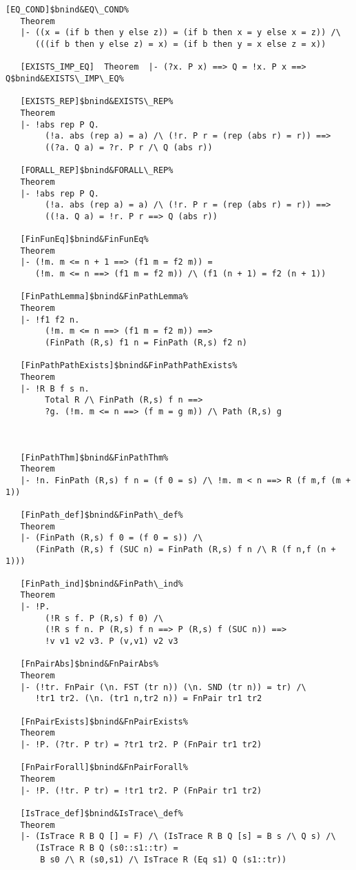 \documentclass[12pt]{article}
\begin{document}
\begin{footnotesize}
\begin{Verbatim}[commandchars=\$\&\%]
   [EQ_COND]$bnind&EQ\_COND%
   Theorem
   |- ((x = (if b then y else z)) = (if b then x = y else x = z)) /\
      (((if b then y else z) = x) = (if b then y = x else z = x))
   
   [EXISTS_IMP_EQ]  Theorem  |- (?x. P x) ==> Q = !x. P x ==> Q$bnind&EXISTS\_IMP\_EQ%
   
   [EXISTS_REP]$bnind&EXISTS\_REP%
   Theorem
   |- !abs rep P Q.
        (!a. abs (rep a) = a) /\ (!r. P r = (rep (abs r) = r)) ==>
        ((?a. Q a) = ?r. P r /\ Q (abs r))
   
   [FORALL_REP]$bnind&FORALL\_REP%
   Theorem
   |- !abs rep P Q.
        (!a. abs (rep a) = a) /\ (!r. P r = (rep (abs r) = r)) ==>
        ((!a. Q a) = !r. P r ==> Q (abs r))
   
   [FinFunEq]$bnind&FinFunEq%
   Theorem
   |- (!m. m <= n + 1 ==> (f1 m = f2 m)) =
      (!m. m <= n ==> (f1 m = f2 m)) /\ (f1 (n + 1) = f2 (n + 1))
   
   [FinPathLemma]$bnind&FinPathLemma%
   Theorem
   |- !f1 f2 n.
        (!m. m <= n ==> (f1 m = f2 m)) ==>
        (FinPath (R,s) f1 n = FinPath (R,s) f2 n)
   
   [FinPathPathExists]$bnind&FinPathPathExists%
   Theorem
   |- !R B f s n.
        Total R /\ FinPath (R,s) f n ==>
        ?g. (!m. m <= n ==> (f m = g m)) /\ Path (R,s) g
   


   [FinPathThm]$bnind&FinPathThm%
   Theorem
   |- !n. FinPath (R,s) f n = (f 0 = s) /\ !m. m < n ==> R (f m,f (m + 1))
   
   [FinPath_def]$bnind&FinPath\_def%
   Theorem
   |- (FinPath (R,s) f 0 = (f 0 = s)) /\
      (FinPath (R,s) f (SUC n) = FinPath (R,s) f n /\ R (f n,f (n + 1)))
   
   [FinPath_ind]$bnind&FinPath\_ind%
   Theorem
   |- !P.
        (!R s f. P (R,s) f 0) /\
        (!R s f n. P (R,s) f n ==> P (R,s) f (SUC n)) ==>
        !v v1 v2 v3. P (v,v1) v2 v3
   
   [FnPairAbs]$bnind&FnPairAbs%
   Theorem
   |- (!tr. FnPair (\n. FST (tr n)) (\n. SND (tr n)) = tr) /\
      !tr1 tr2. (\n. (tr1 n,tr2 n)) = FnPair tr1 tr2
   
   [FnPairExists]$bnind&FnPairExists%
   Theorem
   |- !P. (?tr. P tr) = ?tr1 tr2. P (FnPair tr1 tr2)
   
   [FnPairForall]$bnind&FnPairForall%
   Theorem
   |- !P. (!tr. P tr) = !tr1 tr2. P (FnPair tr1 tr2)
   
   [IsTrace_def]$bnind&IsTrace\_def%
   Theorem
   |- (IsTrace R B Q [] = F) /\ (IsTrace R B Q [s] = B s /\ Q s) /\
      (IsTrace R B Q (s0::s1::tr) =
       B s0 /\ R (s0,s1) /\ IsTrace R (Eq s1) Q (s1::tr))
   

\end{Verbatim}
\end{footnotesize}
\end{document}

